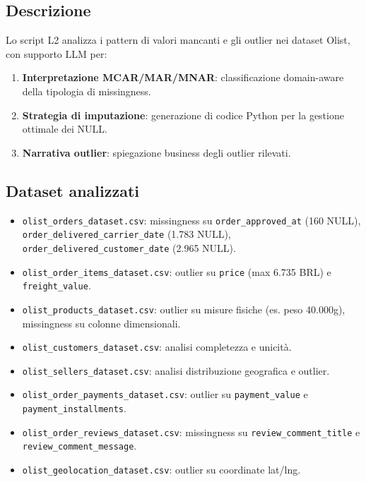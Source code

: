 \documentclass[12pt,a4paper]{article}
\begin{document}
\subsection{Descrizione}

Lo script L2 analizza i pattern di valori mancanti e gli outlier nei dataset
Olist, con supporto LLM per:

\begin{enumerate}
  \item \textbf{Interpretazione MCAR/MAR/MNAR}: classificazione domain-aware
        della tipologia di missingness.
  \item \textbf{Strategia di imputazione}: generazione di codice Python per
        la gestione ottimale dei NULL.
  \item \textbf{Narrativa outlier}: spiegazione business degli outlier rilevati.
\end{enumerate}

\subsection{Dataset analizzati}

\begin{itemize}
  \item \texttt{olist\_orders\_dataset.csv}: missingness su \texttt{order\_approved\_at}
        (160 NULL), \texttt{order\_delivered\_carrier\_date} (1.783 NULL),
        \texttt{order\_delivered\_customer\_date} (2.965 NULL).
  \item \texttt{olist\_order\_items\_dataset.csv}: outlier su \texttt{price}
        (max 6.735 BRL) e \texttt{freight\_value}.
  \item \texttt{olist\_products\_dataset.csv}: outlier su misure fisiche
        (es. peso 40.000g), missingness su colonne dimensionali.
  \item \texttt{olist\_customers\_dataset.csv}: analisi completezza e unicità.
  \item \texttt{olist\_sellers\_dataset.csv}: analisi distribuzione geografica e outlier.
  \item \texttt{olist\_order\_payments\_dataset.csv}: outlier su \texttt{payment\_value}
        e \texttt{payment\_installments}.
  \item \texttt{olist\_order\_reviews\_dataset.csv}: missingness su
        \texttt{review\_comment\_title} e \texttt{review\_comment\_message}.
  \item \texttt{olist\_geolocation\_dataset.csv}: outlier su coordinate lat/lng.
\end{itemize}
\end{document}

